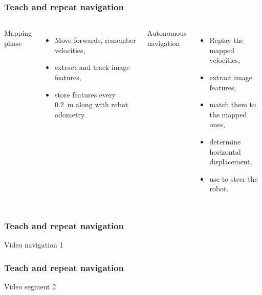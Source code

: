 \begin{frame}
\frametitle{Teach and repeat navigation}
	\begin{columns}
		\begin{normalsize}
			Mapping phase
		\end{normalsize}
		\begin{itemize}
			\item Move forwards, remember velocities,
			\item extract and track image features,
			\item store features every 0.2~m along with robot odometry.
		\end{itemize}
		\begin{normalsize}
			Autonomous navigation	
		\end{normalsize}
		\begin{itemize}
			\item Replay the mapped velocities,
			\item extract image features, 
			\item match them to the mapped ones,
			\item determine horizontal displacement,
			\item use to steer the robot.
		\end{itemize}
	\end{columns}
\end{frame}

\begin{frame}
\frametitle{Teach and repeat navigation}
	Video navigation 1  
\end{frame}

\begin{frame}
\frametitle{Teach and repeat navigation}
	Video segment 2  
\end{frame}



